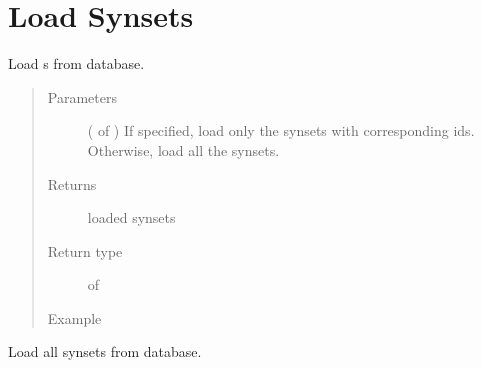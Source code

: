 \documentclass[letterpaper,10pt,english]{sphinxmanual}
\begin{document}
\section{Load Synsets}
\label{\detokenize{index:module-loacore.load.synset_load}}\label{\detokenize{index:load-synsets}}

\begin{fulllineitems}
\label{\detokenize{index:loacore.load.synset_load.load_synsets}}
Load  s from database.
\begin{quote}\begin{description}
\item[{Parameters}] \leavevmode
{} ( of ) \textendash{} If specified, load only the synsets with corresponding ids. Otherwise, load all the synsets.

\item[{Returns}] \leavevmode
loaded synsets

\item[{Return type}] \leavevmode
{} of 

\item[{Example}] \leavevmode
\end{description}\end{quote}

Load all synsets from database.

%
\begin{sphinxVerbatim}[commandchars=\\\{\}]
   
  
\PYG{p}{[}\PYG{p}{]}
\PYG{p}{[}\PYG{p}{]}
\end{sphinxVerbatim}

\end{fulllineitems}
\end{document}

